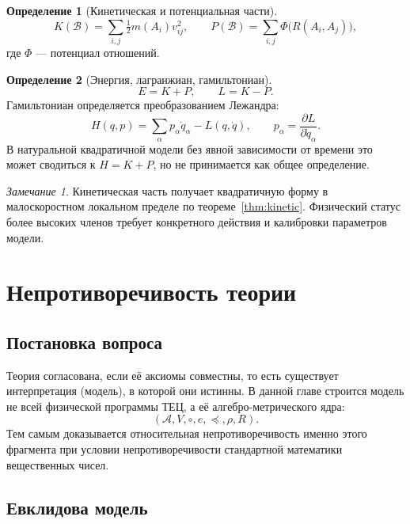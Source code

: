 \documentclass[12pt,a4paper,oneside]{book}
\theoremstyle{definition}
\newtheorem{definition}{Определение}[chapter]
\theoremstyle{plain}
\theoremstyle{remark}
\newtheorem{remark}{Замечание}[chapter]
\newcommand{\Parts}{\mathcal A}
\newcommand{\SubParts}{\mathcal B}
\newcommand{\Rel}{R}
\newcommand{\Values}{V}
\newcommand{\comp}{\circ}
\newcommand{\Vord}{\preceq}
\newcommand{\norm}{\rho}
\newcommand{\ide}{e}
\begin{document}
\begin{definition}[Кинетическая и потенциальная части]
\[
K(\SubParts)=\sum_{i,j}\tfrac12 m(A_i)v_{ij}^2,\qquad
P(\SubParts)=\sum_{i,j}\Phi\bigl(\Rel(A_i,A_j)\bigr),
\]
где $\Phi$ --- потенциал отношений.
\end{definition}

\begin{definition}[Энергия, лагранжиан, гамильтониан]
\[
E=K+P,\qquad L=K-P.
\]
Гамильтониан определяется преобразованием Лежандра:
\[
H(q,p)=\sum_\alpha p_\alpha \dot q_\alpha-L(q,\dot q),
\qquad
p_\alpha=\frac{\partial L}{\partial \dot q_\alpha}.
\]
В натуральной квадратичной модели без явной зависимости от времени это может
сводиться к $H=K+P$, но не принимается как общее определение.
\end{definition}

\begin{remark}
Кинетическая часть получает квадратичную форму в малоскоростном локальном пределе
по теореме~\ref{thm:kinetic}. Физический статус более высоких членов требует
конкретного действия и калибровки параметров модели.
\end{remark}

\chapter{Непротиворечивость теории}

\section{Постановка вопроса}

Теория согласована, если её аксиомы совместны, то есть существует интерпретация
(модель), в которой они истинны. В данной главе строится модель не всей физической
программы ТЕЦ, а её алгебро-метрического ядра:
\[
(\Parts,\Values,\comp,\ide,\Vord,\norm,\Rel).
\]
Тем самым доказывается относительная непротиворечивость именно этого фрагмента при
условии непротиворечивости стандартной математики вещественных чисел.

\section{Евклидова модель}
\end{document}
